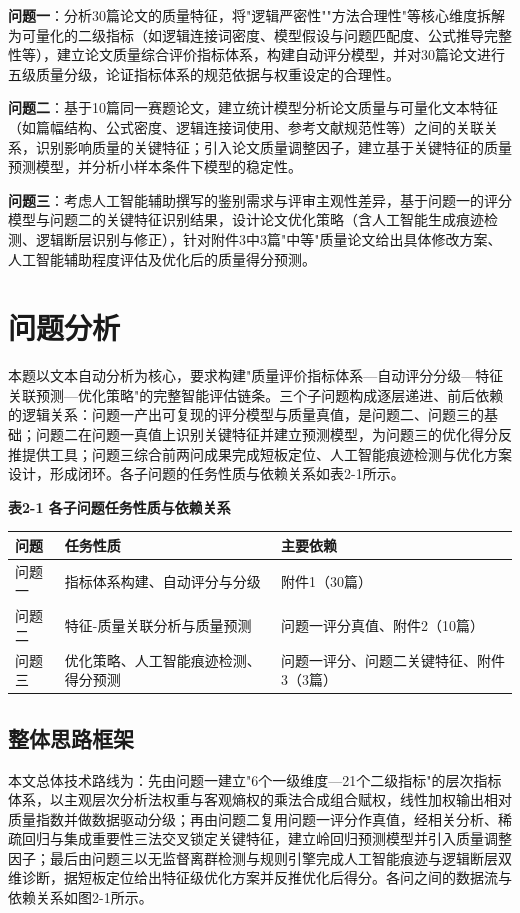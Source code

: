 \documentclass[withoutpreface]{cumcmthesis}
\begin{document}
\textbf{问题一}：分析30篇论文的质量特征，将"逻辑严密性""方法合理性"等核心维度拆解为可量化的二级指标（如逻辑连接词密度、模型假设与问题匹配度、公式推导完整性等），建立论文质量综合评价指标体系，构建自动评分模型，并对30篇论文进行五级质量分级，论证指标体系的规范依据与权重设定的合理性。

\textbf{问题二}：基于10篇同一赛题论文，建立统计模型分析论文质量与可量化文本特征（如篇幅结构、公式密度、逻辑连接词使用、参考文献规范性等）之间的关联关系，识别影响质量的关键特征；引入论文质量调整因子，建立基于关键特征的质量预测模型，并分析小样本条件下模型的稳定性。

\textbf{问题三}：考虑人工智能辅助撰写的鉴别需求与评审主观性差异，基于问题一的评分模型与问题二的关键特征识别结果，设计论文优化策略（含人工智能生成痕迹检测、逻辑断层识别与修正），针对附件3中3篇"中等"质量论文给出具体修改方案、人工智能辅助程度评估及优化后的质量得分预测。

\section{问题分析}
本题以文本自动分析为核心，要求构建"质量评价指标体系—自动评分分级—特征关联预测—优化策略"的完整智能评估链条。三个子问题构成逐层递进、前后依赖的逻辑关系：问题一产出可复现的评分模型与质量真值，是问题二、问题三的基础；问题二在问题一真值上识别关键特征并建立预测模型，为问题三的优化得分反推提供工具；问题三综合前两问成果完成短板定位、人工智能痕迹检测与优化方案设计，形成闭环。各子问题的任务性质与依赖关系如表2-1所示。

\textbf{表2-1 各子问题任务性质与依赖关系}

\begin{table}[htbp]
\centering
\small
\begin{tabularx}{\textwidth}{XXX}
\toprule
问题 & 任务性质 & 主要依赖 \\
\midrule
问题一 & 指标体系构建、自动评分与分级 & 附件1（30篇） \\
问题二 & 特征-质量关联分析与质量预测 & 问题一评分真值、附件2（10篇） \\
问题三 & 优化策略、人工智能痕迹检测、得分预测 & 问题一评分、问题二关键特征、附件3（3篇） \\
\bottomrule
\end{tabularx}
\end{table}
\subsection{整体思路框架}
本文总体技术路线为：先由问题一建立"6个一级维度—21个二级指标"的层次指标体系，以主观层次分析法权重与客观熵权的乘法合成组合赋权，线性加权输出相对质量指数并做数据驱动分级；再由问题二复用问题一评分作真值，经相关分析、稀疏回归与集成重要性三法交叉锁定关键特征，建立岭回归预测模型并引入质量调整因子；最后由问题三以无监督离群检测与规则引擎完成人工智能痕迹与逻辑断层双维诊断，据短板定位给出特征级优化方案并反推优化后得分。各问之间的数据流与依赖关系如图2-1所示。
\end{document}
